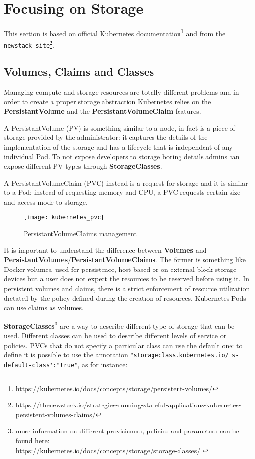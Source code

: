\section{Focusing on Storage}
\label{focusing-on-storage}

This section is based on official Kubernetes documentation\footnote{%
  \url{https://kubernetes.io/docs/concepts/storage/persistent-volumes/}} and
from the \texttt{newstack site}\footnote{\sloppy
  \url{https://thenewstack.io/strategies-running-stateful-applications-kubernetes-persistent-volumes-claims/}}.

\subsection{Volumes, Claims and Classes}
\label{volumes-claims-and-classes}

Managing compute and storage resources are totally different problems and in
order to create a proper storage abstraction Kubernetes relies on the
\textbf{PersistantVolume} and the \textbf{PersistantVolumeClaim} features.

A PersistantVolume (PV) is something similar to a node, in fact is a piece of
storage provided by the administrator: it captures the details of the
implementation of the storage and has a lifecycle that is independent of any
individual Pod. To not expose developers to storage boring details admins can
expose different PV types through \textbf{StorageClasses}.

A PersistantVolumeClaim (PVC) instead is a request for storage and it is similar
to a Pod: instead of requesting memory and CPU, a PVC requests certain size and
access mode to storage.

\begin{figure}[htbp]
\centering
\texttt{[image: kubernetes\_pvc]}
\caption{PersistantVolumeClaims management}
\end{figure}

It is important to understand the difference between \textbf{Volumes} and
\textbf{PersistantVolumes}/\textbf{PersistantVolumeClaims}. The former is
something like Docker volumes, used for persistence, host-based or on external
block storage devices but a user does not expect the resources to be reserved
before using it. In persistent volumes and claims, there is a strict enforcement
of resource utilization dictated by the policy defined during the creation of
resources. Kubernetes Pods can use claims as volumes.

\textbf{StorageClasses}\footnote{more information on different provisioners,
  policies and parameters can be found here: \\\url{
 https://kubernetes.io/docs/concepts/storage/storage-classes/ }} are a way to
describe different type of storage that can be used. Different classes can be
used to describe different levels of service or policies. PVCs that do not
specify a particular class can use the default one: to define it is possible to
use the annotation \verb!"storageclass.kubernetes.io/is-default-class":"true"!,
as for instance:

